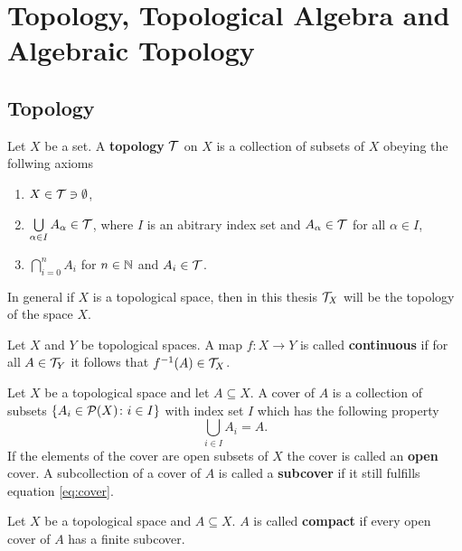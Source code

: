 \section{Topology, Topological Algebra and Algebraic Topology}
\subsection{Topology}

\begin{defin}
  Let $X$ be a set. A \textbf{topology} $\T$ on $X$ is a collection of subsets of $X$ obeying the follwing axioms
  \begin{enumerate}
    \item $X \in \T \ni \emptyset$,
    \item $\bigcup\limits_{\alpha \in I}A_{\alpha} \in \T$, where $I$ is an abitrary index set and $A_{\alpha} \in \T$ for all $\alpha \in I$,
    \item $\bigcap\limits_{i=0}^n A_i$ for $n \in \N$ and $A_i \in \T$.
  \end{enumerate}
\end{defin}

In general if $X$ is a topological space, then in this thesis $\T_X$ will be the topology of the space $X$.

\begin{defin}
  Let $X$ and $Y$ be topological spaces. A map $f\colon X \to Y$ is called \textbf{continuous} if for all $A \in \T_Y$ it follows that $f^{-1}(A) \in \T_X$.  
\end{defin}

\begin{defin}
  Let $X$ be a topological space and let $A \subseteq X$. A cover of $A$ is a collection of subsets $\left\{A_i \in \P(X)\colon i \in I \right\}$ with index set $I$ which has the following property
  \begin{equation}\label{eq:cover}
    \bigcup\limits_{i\in I}A_i = A.
  \end{equation}
  If the elements of the cover are open subsets of $X$ the cover is called an \textbf{open} cover.
  A subcollection of a cover of $A$ is called a \textbf{subcover} if it still fulfills equation \ref{eq:cover}.
\end{defin}

\begin{defin}
  Let $X$ be a topological space and $A \subseteq X$. $A$ is called \textbf{compact} if every open cover of $A$ has a finite subcover. 
\end{defin}

